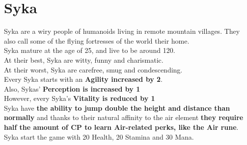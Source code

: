 \section{Syka}\label{race:syka}
Syka are a wiry people of humanoids living in remote mountain villages.
They also call some of the flying fortresses of the world their home.\\
Syka mature at the age of 25, and live to be around 120.\\
At their best, Syka are witty, funny and charismatic.\\
At their worst, Syka are carefree, smug and condescending.\\
Every Syka starts with an \textbf{Agility increased by 2}.\\
Also, Sykas' \textbf{Perception is increased by 1}\\
However, every Syka's \textbf{Vitality is reduced by 1}\\
Syka have \textbf{the ability to jump double the height and distance than normally} and thanks to their natural affinity to the air element \textbf{they require half the amount of CP to learn Air-related perks, like the Air rune}.\\
Syka start the game with 20 Health, 20 Stamina and 30 Mana.